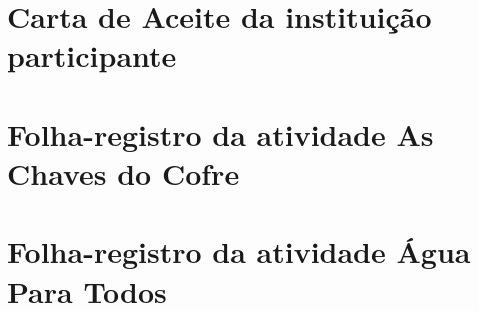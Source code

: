 \partanexos

\chapter{Carta de Aceite da instituição participante}
\label{anexo:carta-aceite}



\chapter{Folha-registro da atividade As Chaves do Cofre}
\label{anexo:chaves-do-cofre}



\chapter{Folha-registro da atividade Água Para Todos}
\label{anexo:agua-para-todos}


